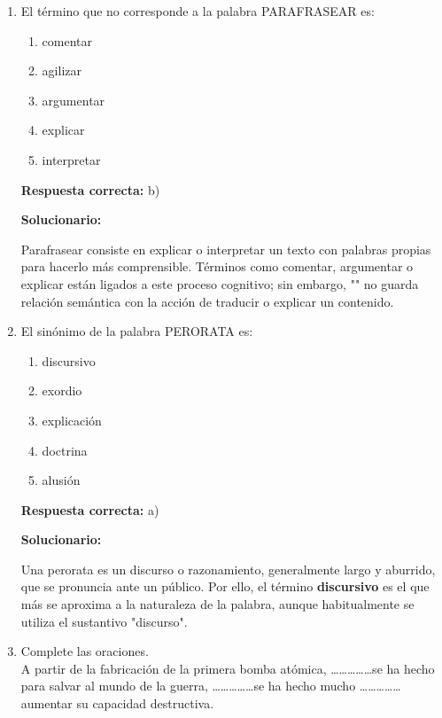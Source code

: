 \begin{enumerate}[resume]

\item El término que no corresponde a la palabra PARAFRASEAR es:

\begin{enumerate}[label=\alph*)]
	\item comentar
	\item agilizar
	\item argumentar
	\item explicar
	\item interpretar
\end{enumerate}

\textbf{Respuesta correcta:} b)

\vspace{2mm}
\textbf{Solucionario:}

Parafrasear consiste en explicar o interpretar un texto con palabras propias para hacerlo más comprensible. Términos como comentar, argumentar o explicar están ligados a este proceso cognitivo; sin embargo, "" no guarda relación semántica con la acción de traducir o explicar un contenido.

\vspace{6mm}

\item El sinónimo de la palabra PERORATA es:

\begin{enumerate}[label=\alph*)]
	\item discursivo
	\item exordio
	\item explicación
	\item doctrina
	\item alusión
\end{enumerate}

\textbf{Respuesta correcta:} a)

\vspace{2mm}
\textbf{Solucionario:}

Una perorata es un discurso o razonamiento, generalmente largo y aburrido, que se pronuncia ante un público. Por ello, el término \textbf{discursivo} es el que más se aproxima a la naturaleza de la palabra, aunque habitualmente se utiliza el sustantivo "discurso".

\vspace{6mm}

\item Complete las oraciones.\\
A partir de la fabricación de la primera bomba atómica, \dots\dots\dots\dots\dots se ha hecho para salvar al mundo de la guerra, \dots\dots\dots\dots\dots se ha hecho mucho \dots\dots\dots\dots\dots aumentar su capacidad destructiva.


\end{enumerate}
